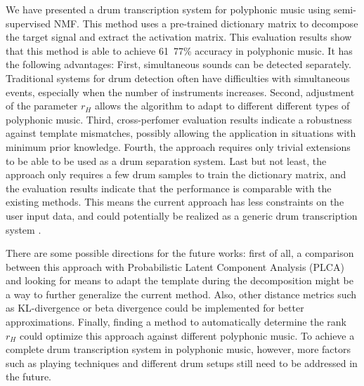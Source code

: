 \documentclass{article}
\begin{document}
We have presented a drum transcription system for polyphonic music using semi-supervised NMF. This method uses a pre-trained dictionary matrix to decompose the target signal and extract the activation matrix. This evaluation results show that this method is able to achieve 61~77\% accuracy in polyphonic music. 
It has the following advantages: 
First, simultaneous sounds can be detected separately. Traditional systems for drum detection often have difficulties with simultaneous events, especially when the number of instruments increases. %
Second, adjustment of the parameter $r_H$ allows the algorithm to adapt to different different types of polyphonic music. 
Third, cross-perfomer evaluation results indicate a robustness against template mismatches, possibly allowing the application in situations with minimum prior knowledge. %
Fourth, the approach requires only trivial extensions to be able to be used as a drum separation system.
Last but not least, the approach only requires a few drum samples to train the dictionary matrix, and the evaluation results indicate that the performance is comparable with the existing methods. This means the current approach has less constraints on the user input data, and could potentially be realized as a generic drum transcription system .

There are some possible directions for the future works: first of all, a comparison between this approach with Probabilistic Latent Component Analysis (PLCA) and looking for means to adapt the template during the decomposition might be a way to further generalize the current method. Also, other distance metrics such as KL-divergence or beta divergence could be implemented for better approximations. Finally, finding a method to automatically determine the rank $r_H$ could optimize this approach against different polyphonic music. To achieve a complete drum transcription system in polyphonic music, however, more factors such as playing techniques and different drum setups still need to be addressed in the future. 
\end{document}
